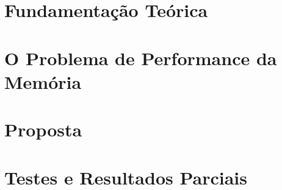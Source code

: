 \setlength\abovedisplayskip{0pt} \setlength\belowdisplayskip{0pt}
\setlength\abovedisplayshortskip{0pt} \setlength\belowdisplayshortskip{0pt}

\chapter{Fundamenta\c{c}\~ao Te\'orica}
\label{cap1}

\chapter{O Problema de Performance da Mem\'oria}
\label{cap2}

\chapter{Proposta}
\label{cap3}

\chapter{Testes e Resultados Parciais}
\label{cap4}

